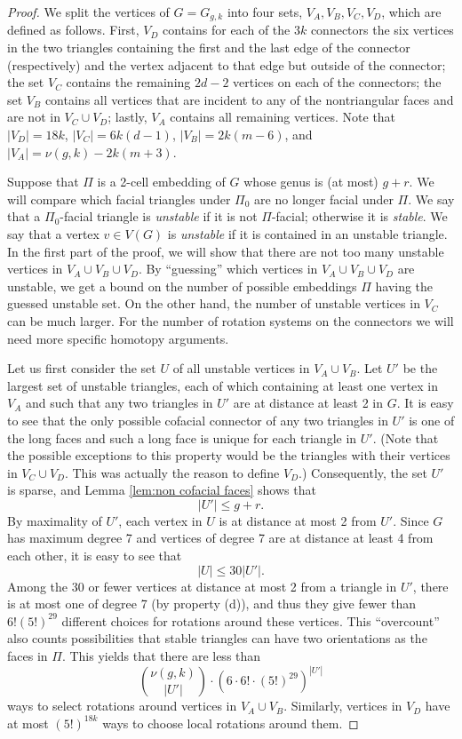\documentclass[10pt,a4paper]{amsart}
\begin{document}
  \begin{proof}
  We split the vertices of $G=G_{g,k}$ into four sets, $V_A,V_B,V_C,V_D$, which are defined as follows. First, $V_D$ contains for each of the $3k$ connectors the six vertices in the two triangles containing the first and the last edge of the connector (respectively) and the vertex adjacent to that edge but outside of the connector; the set $V_C$ contains the remaining $2d-2$ vertices on each of the connectors; the set $V_B$ contains all vertices that are incident to any of the nontriangular faces and are not in $V_C\cup V_D$; lastly, $V_A$ contains all remaining vertices.
  Note that $|V_D| = 18k$, $|V_C| = 6k(d-1)$, $|V_B| = 2k(m-6)$, and $|V_A| = \nu(g,k)-2k(m+3)$.

  Suppose that $\Pi$ is a 2-cell embedding of $G$ whose genus is (at most) $g+r$. We will compare which facial triangles under $\Pi_0$ are no longer facial under $\Pi$. We say that a $\Pi_0$-facial triangle is \emph{unstable} if it is not $\Pi$-facial; otherwise it is \emph{stable}. We say that a vertex $v\in V(G)$ is \emph{unstable} if it is contained in an unstable triangle. In the first part of the proof, we will show that there are not too many unstable vertices in $V_A\cup V_B\cup V_D$. By ``guessing'' which vertices in $V_A\cup V_B\cup V_D$ are unstable, we get a bound on the number of possible embeddings $\Pi$ having the guessed unstable set. On the other hand, the number of unstable vertices in $V_C$ can be much larger. For the number of rotation systems on the connectors we will need more specific homotopy arguments.

  Let us first consider the set $U$ of all unstable vertices in $V_A\cup V_B$. Let $U'$ be the largest set of unstable triangles, each of which containing at least one vertex in $V_A$ and such that any two triangles in $U'$ are at distance at least 2 in $G$. It is easy to see that the only possible cofacial connector of any two triangles in $U'$ is one of the long faces and such a long face is unique for each triangle in $U'$. (Note that the possible exceptions to this property would be the triangles with their vertices in $V_C\cup V_D$. This was actually the reason to define $V_D$.) Consequently, the set $U'$ is sparse, and Lemma \ref{lem:non cofacial faces} shows that
  $$|U'|\le g+r.$$
  By maximality of $U'$, each vertex in $U$ is at distance at most 2 from $U'$. Since $G$ has maximum degree 7 and vertices of degree 7 are at distance at least 4 from each other, it is easy to see that
  $$|U|\le 30|U'|.$$
  Among the 30 or fewer vertices at distance at most 2 from a triangle in $U'$, there is at most one of degree 7 (by property (d)), and thus they give fewer than $6!(5!)^{29}$ different choices for rotations around these vertices. This ``overcount'' also counts possibilities that stable triangles can have two orientations as the faces in $\Pi$.
  This yields that there are less than
  $$
     \binom{\nu(g,k)}{|U'|}\cdot \left(6 \cdot 6! \cdot (5!)^{29}\right)^{|U'|}
  $$
  ways to select rotations around vertices in $V_A\cup V_B$. Similarly, vertices in $V_D$ have at most $(5!)^{18k}$ ways to choose local rotations around them.


\end{proof}
\end{document}
